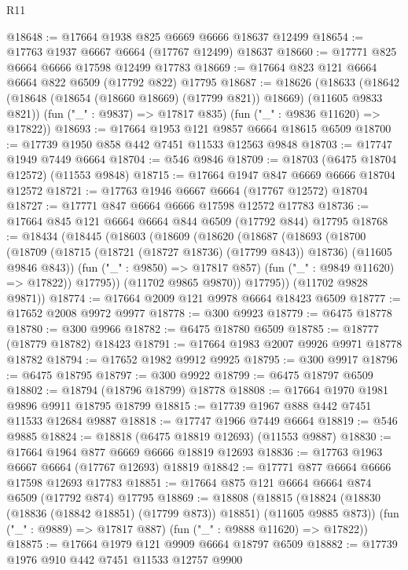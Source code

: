 \begin{lexlean}{R11}
\begin{coremodule}
@18648 := @17664 @1938 @825 @6669 @6666 @18637 @12499
@18654 := @17763 @1937 @6667 @6664 (@17767 @12499) @18637
@18660 := @17771 @825 @6664 @6666 @17598 @12499 @17783
@18669 := @17664 @823 @121 @6664 @6664 @822 @6509 (@17792 @822) @17795
@18687 := @18626
    (@18633
      (@18642 (@18648 (@18654 (@18660 @18669) (@17799 @821)) @18669) (@11605 @9833 @821))
      (fun ("_" : @9837) => @17817 @835)
      (fun ("_" : @9836 @11620) => @17822))
@18693 := @17664 @1953 @121 @9857 @6664 @18615 @6509
@18700 := @17739 @1950 @858 @442 @7451 @11533 @12563 @9848
@18703 := @17747 @1949 @7449 @6664
@18704 := @546 @9846
@18709 := @18703 (@6475 @18704 @12572) (@11553 @9848)
@18715 := @17664 @1947 @847 @6669 @6666 @18704 @12572
@18721 := @17763 @1946 @6667 @6664 (@17767 @12572) @18704
@18727 := @17771 @847 @6664 @6666 @17598 @12572 @17783
@18736 := @17664 @845 @121 @6664 @6664 @844 @6509 (@17792 @844) @17795
@18768 := @18434
    (@18445
      (@18603
        (@18609
          (@18620
            (@18687
              (@18693
                (@18700
                  (@18709
                    (@18715 (@18721 (@18727 @18736) (@17799 @843)) @18736)
                    (@11605 @9846 @843))
                  (fun ("_" : @9850) => @17817 @857)
                  (fun ("_" : @9849 @11620) => @17822))
                @17795))
            (@11702 @9865 @9870))
          @17795))
      (@11702 @9828 @9871))
@18774 := @17664 @2009 @121 @9978 @6664 @18423 @6509
@18777 := @17652 @2008 @9972 @9977
@18778 := @300 @9923
@18779 := @6475 @18778
@18780 := @300 @9966
@18782 := @6475 @18780 @6509
@18785 := @18777 (@18779 @18782) @18423
@18791 := @17664 @1983 @2007 @9926 @9971 @18778 @18782
@18794 := @17652 @1982 @9912 @9925
@18795 := @300 @9917
@18796 := @6475 @18795
@18797 := @300 @9922
@18799 := @6475 @18797 @6509
@18802 := @18794 (@18796 @18799) @18778
@18808 := @17664 @1970 @1981 @9896 @9911 @18795 @18799
@18815 := @17739 @1967 @888 @442 @7451 @11533 @12684 @9887
@18818 := @17747 @1966 @7449 @6664
@18819 := @546 @9885
@18824 := @18818 (@6475 @18819 @12693) (@11553 @9887)
@18830 := @17664 @1964 @877 @6669 @6666 @18819 @12693
@18836 := @17763 @1963 @6667 @6664 (@17767 @12693) @18819
@18842 := @17771 @877 @6664 @6666 @17598 @12693 @17783
@18851 := @17664 @875 @121 @6664 @6664 @874 @6509 (@17792 @874) @17795
@18869 := @18808
    (@18815
      (@18824 (@18830 (@18836 (@18842 @18851) (@17799 @873)) @18851) (@11605 @9885 @873))
      (fun ("_" : @9889) => @17817 @887)
      (fun ("_" : @9888 @11620) => @17822))
@18875 := @17664 @1979 @121 @9909 @6664 @18797 @6509
@18882 := @17739 @1976 @910 @442 @7451 @11533 @12757 @9900

\end{coremodule}
\end{lexlean}
